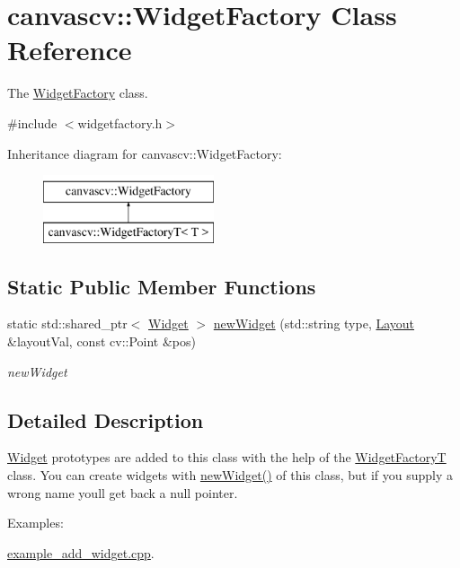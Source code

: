 \hypertarget{classcanvascv_1_1WidgetFactory}{}\section{canvascv\+:\+:Widget\+Factory Class Reference}
\label{classcanvascv_1_1WidgetFactory}


The \hyperlink{classcanvascv_1_1WidgetFactory}{Widget\+Factory} class.  




{\ttfamily \#include $<$widgetfactory.\+h$>$}

Inheritance diagram for canvascv\+:\+:Widget\+Factory\+:\begin{figure}[H]
\begin{center}
\leavevmode
\includegraphics[height=2.000000cm]{classcanvascv_1_1WidgetFactory}
\end{center}
\end{figure}
\subsection*{Static Public Member Functions}
\begin{DoxyCompactItemize}
\item 
static std\+::shared\+\_\+ptr$<$ \hyperlink{classcanvascv_1_1Widget}{Widget} $>$ \hyperlink{classcanvascv_1_1WidgetFactory_abfde5dd5df7726be47f17a83197cb0c4}{new\+Widget} (std\+::string type, \hyperlink{classcanvascv_1_1Layout}{Layout} \&layout\+Val, const cv\+::\+Point \&pos)
\begin{DoxyCompactList}\small\item\em new\+Widget \end{DoxyCompactList}\end{DoxyCompactItemize}


\subsection{Detailed Description}
\hyperlink{classcanvascv_1_1Widget}{Widget} prototypes are added to this class with the help of the \hyperlink{classcanvascv_1_1WidgetFactoryT}{Widget\+FactoryT} class. You can create widgets with \hyperlink{classcanvascv_1_1WidgetFactory_abfde5dd5df7726be47f17a83197cb0c4}{new\+Widget()} of this class, but if you supply a wrong name you\textquotesingle{}ll get back a null pointer. \begin{Desc}
\item[Examples\+: ]\par
\hyperlink{example_add_widget_8cpp-example}{example\+\_\+add\+\_\+widget.\+cpp}.\end{Desc}


